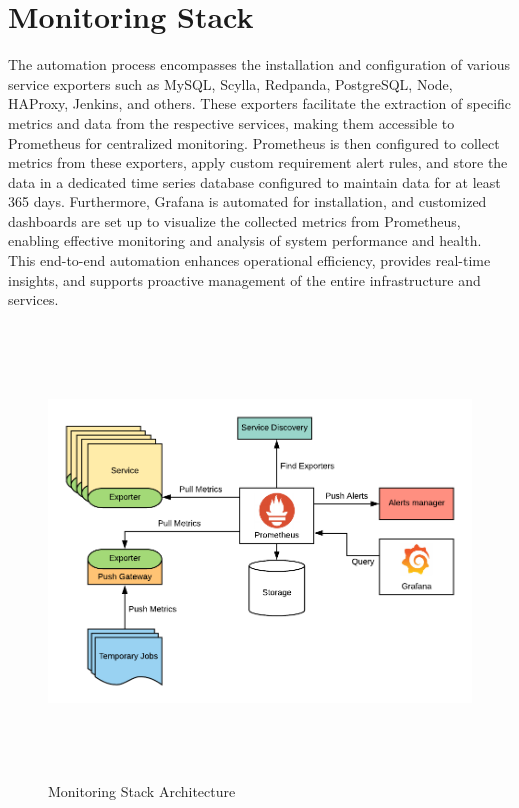 \documentclass[12pt,a4paper,oneside]{report}
\begin{document}
\section{Monitoring Stack}
\par The automation process encompasses the installation and configuration of various service exporters such as MySQL, Scylla, Redpanda, PostgreSQL, Node, HAProxy, Jenkins, and others. These exporters facilitate the extraction of specific metrics and data from the respective services, making them accessible to Prometheus for centralized monitoring. Prometheus is then configured to collect metrics from these exporters, apply custom requirement alert rules, and store the data in a dedicated time series database configured to maintain data for at least 365 days. Furthermore, Grafana is automated for installation, and customized dashboards are set up to visualize the collected metrics from Prometheus, enabling effective monitoring and analysis of system performance and health. This end-to-end automation enhances operational efficiency, provides real-time insights, and supports proactive management of the entire infrastructure and services.

\begin{figure}[ht]
    \centering
    \includegraphics[width=140mm , height = 120mm]{images/monstack.png}
    \caption{Monitoring Stack Architecture}
    \label{fig:figure2_2}
\end{figure}
\end{document}
